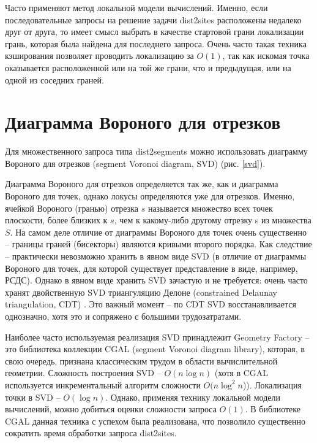 Часто применяют метод локальной модели вычислений. Именно, если
последовательные запросы на решение задачи dist2sites расположены недалеко
друг от друга, то имеет смысл выбрать в качестве стартовой грани локализации
грань, которая была найдена для последнего запроса. Очень часто такая
техника кэширования позволяет проводить локализацию за $O(1)$, так как
искомая точка оказывается расположенной или на той же грани, что и
предыдущая, или на одной из соседних граней.

\section{Диаграмма Вороного для отрезков}

Для множественного запроса типа dist2segments можно использовать
диаграмму Вороного для отрезков (segment Voronoi diagram, SVD) \cite{SVD} (рис. \ref{svd}).


Диаграмма Вороного для отрезков определяется так же, как и диаграмма
Вороного для точек, однако локусы определяются уже для отрезков. Именно,
ячейкой Вороного (гранью) отрезка $s$ называется множество всех точек
плоскости, более близких к $s$, чем к какому-либо другому отрезку s из
множества $S$. На самом деле отличие от диаграммы Вороного для точек очень
существенно -- границы граней (бисекторы) являются кривыми второго
порядка. Как следствие -- практически невозможно хранить в явном виде SVD
(в отличие от диаграммы Вороного для точек, для которой существует
представление в виде, например, РСДС).
Однако в явном виде хранить SVD зачастую и не требуется: очень часто
хранят двойственную SVD триангуляцию Делоне (constrained Delaunay
triangulation, CDT) \cite{CGAL}. Это важный момент -- по CDT SVD восстанавливается
однозначно, хотя это и сопряжено с большими трудозатратами.

Наиболее часто используемая реализация SVD принадлежит Geometry
Factory -- это библиотека коллекции CGAL \cite{CGAL} (segment Voronoi diagram library),
которая, в свою очередь, признана классическим трудом в области
вычислительной геометрии.
Сложность построения SVD -- $O(n \log n)$ \cite{CGAL} (хотя в CGAL используется
инкрементальный алгоритм сложности $O(n \log^2 n$)). Локализация точки в SVD --
$O(\log n)$. Однако, применяя технику локальной модели вычислений, можно
добиться оценки сложности запроса $O(1)$.
В библиотеке CGAL данная техника с успехом была реализована, что
позволило существенно сократить время обработки запроса dist2sites.

